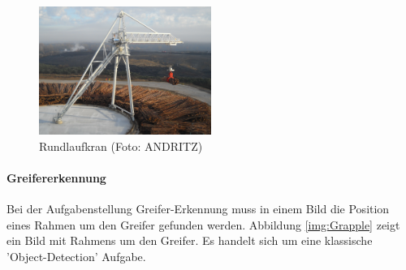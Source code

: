 	\begin{figure}[h]
		\centering
		\includegraphics[width=0.5\textwidth, center]{bilder/Grundlagen/Kran_vollstaendig_N1_030.jpg}
		\caption[Rundlaufkran]{Rundlaufkran (Foto: ANDRITZ)}
		\label{img:CircularCrane}
	\end{figure}		

	\paragraph{Greifererkennung} Bei der Aufgabenstellung Greifer-Erkennung muss in einem Bild die Position eines Rahmen um den Greifer gefunden werden. Abbildung \ref{img:Grapple} zeigt ein Bild mit Rahmens um den Greifer. Es handelt sich um eine klassische 'Object-Detection' Aufgabe.
